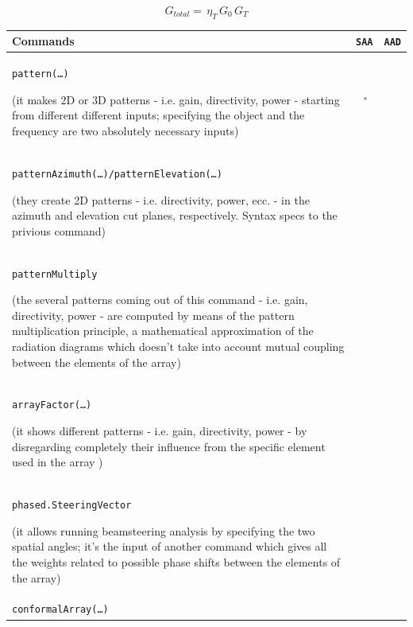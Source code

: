 \documentclass[10 pt,a4paper,twocolumn]{article}
\newcommand{\cmark}{\ding{51}}%
\newcommand{\xmark}{\ding{55}}%
\begin{document}
{\begin{equation}
	G_{total}=\,\eta_T\,G_0\,G_T
	\label{eq:pattern multiplication}
\end{equation}
\begin{table}[bt!]
	\begin{center}
	{
		\begin{tabular}{|m{15.5cm}|c|c|}
			\hline
			\textbf{Commands} & \texttt{\color{Mahogany}SAA} & \texttt{\color{Mahogany}AAD} \\
			\hline
		 \colorbox{backcolour}{\texttt{pattern(\dots)}}
			
			\small{ {(it makes 2D or 3D patterns - i.e. gain, directivity, power -  starting from different different inputs; 
					specifying the object and the frequency are two absolutely necessary inputs)}}
			& \textcolor{ForestGreen}{\cmark} $\:^*$
			
		& \textcolor{ForestGreen}{\cmark} 
			
			{} \\
			\hline
			\colorbox{backcolour}{\texttt{patternAzimuth(\dots)/patternElevation(\dots)}}
			
			\small{ {(they create 2D patterns - i.e. directivity, power, ecc. - in the azimuth and elevation cut planes, respectively. Syntax specs to the privious command)}} & \textcolor{ForestGreen}{\cmark} & \textcolor{Mahogany}{\xmark} \\
			\hline
		\colorbox{backcolour}{\texttt{patternMultiply}}
			
			\small{{(the several patterns coming out of this command - i.e. gain, directivity, power - are computed by means of the pattern multiplication principle, a mathematical approximation of the radiation diagrams which doesn't take into account mutual coupling between the elements of the array)}} & \textcolor{Mahogany}{\xmark} &\textcolor{ForestGreen}{\cmark}  \\
			\hline
		\colorbox{backcolour}{\texttt{arrayFactor(\dots)}}
			
			\small{{(it shows different patterns - i.e. gain, directivity, power - by disregarding completely their influence from the specific element used in the array )}} &\textcolor{Mahogany}{\xmark} & \textcolor{ForestGreen}{\cmark} \\
			\hline
		\colorbox{backcolour}{\texttt{phased.SteeringVector}}
			
			\small{{(it allows running beamsteering analysis by specifying the two spatial angles; it's the input of another command which gives all the weights related to possible phase shifts between the elements of the array)}} & \textcolor{ForestGreen}{\cmark} & \textcolor{Mahogany}{\xmark} \\
			\hline
		\colorbox{backcolour}{\texttt{conformalArray(\dots)}}
			

\end{tabular}}
\end{center}
\end{table}}
\end{document}
